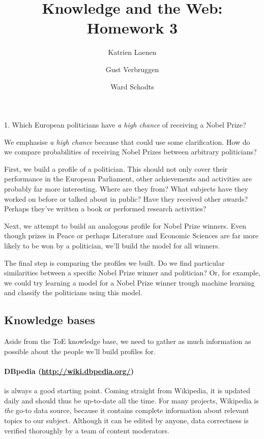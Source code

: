 \documentclass[12pt,a4paper]{article}
\author{
  Katrien Laenen\\
  \and
  Gust Verbruggen\\
  \and
  Ward Schodts
}
\title{Knowledge and the Web: Homework 3}
\begin{document}
\maketitle

\begin{center}
	\Large
1. Which European politicians have \emph{a high chance} of receiving a Nobel Prize?
\end{center}

We emphasise \emph{a high chance} because that could use some clarification. How do we compare probabilities of receiving Nobel Prizes between arbitrary politicians?
\par First, we build a profile of a politician. This should not only cover their performance in the European Parliament, other achievements and activities are probably far more interesting. Where are they from? What subjects have they worked on before or talked about in public? Have they received other awards? Perhaps they've written a book or performed research activities?
\par Next, we attempt to build an analogous profile for Nobel Prize winners. Even though prizes in Peace or perhaps Literature and Economic Sciences are far more likely to be won by a politician, we'll build the model for all winners.
\par The final step is comparing the profiles we built. Do we find particular similarities between a specific Nobel Prize winner and politician? Or, for example, we could try learning a model for a Nobel Prize winner trough machine learning and classify the politicians using this model.

\subsection*{Knowledge bases}

Aside from the ToE knowledge base, we need to gather as much information as possible about the people we'll build profiles for.

\paragraph{\textbf{DBpedia} (\url{http://wiki.dbpedia.org/})}
is always a good starting point. Coming straight from Wikipedia, it is updated daily and should thus be up-to-date all the time. For many projects, Wikipedia is \emph{the} go-to data source, because it contains complete information about relevant topics to our subject. Although it can be edited by anyone, data correctness is verified thoroughly by a team of content moderators.
\end{document}
